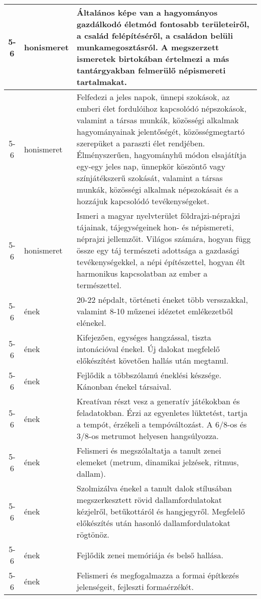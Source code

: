 \begin{small}
\begin{longtable}{c | p{2cm} |  p{11cm} }
              5-6 & honismeret & Általános képe van a hagyományos gazdálkodó életmód fontosabb területeiről, a család felépítéséről, a családon belüli munkamegosztásról. A megszerzett ismeretek birtokában értelmezi a más tantárgyakban felmerülő népismereti tartalmakat. \\ \hline
              5-6 & honismeret & Felfedezi a jeles napok, ünnepi szokások, az emberi élet fordulóihoz kapcsolódó népszokások, valamint a társas munkák, közösségi alkalmak hagyományainak jelentőségét, közösségmegtartó szerepüket a paraszti élet rendjében. Élményszerűen, hagyományhű módon elsajátítja egy-egy jeles nap, ünnepkör köszöntő vagy színjátékszerű szokását, valamint a társas munkák, közösségi alkalmak népszokásait és a hozzájuk kapcsolódó tevékenységeket. \\ \hline
              5-6 & honismeret & Ismeri a magyar nyelvterület földrajzi-néprajzi tájainak, tájegységeinek hon- és népismereti, néprajzi jellemzőit. Világos számára, hogyan függ össze egy táj természeti adottsága a gazdasági tevékenységekkel, a népi építészettel, hogyan élt harmonikus kapcsolatban az ember a természettel. \\ \hline
              5-6 & ének & 20-22 népdalt, történeti éneket több versszakkal, valamint 8-10 műzenei idézetet emlékezetből elénekel. \\ \hline
              5-6 & ének & Kifejezően, egységes hangzással, tiszta intonációval énekel. Új dalokat megfelelő előkészítést követően hallás után megtanul. \\ \hline
              5-6 & ének & Fejlődik a többszólamú éneklési készsége. Kánonban énekel társaival. \\ \hline
              5-6 & ének & Kreatívan részt vesz a generatív játékokban és feladatokban. Érzi az egyenletes lüktetést, tartja a tempót, érzékeli a tempóváltozást. A 6/8-os és 3/8-os metrumot helyesen hangsúlyozza. \\ \hline
              5-6 & ének & Felismeri és megszólaltatja a tanult zenei elemeket (metrum, dinamikai jelzések, ritmus, dallam). \\ \hline
              5-6 & ének & Szolmizálva énekel a tanult dalok stílusában megszerkesztett rövid dallamfordulatokat kézjelről, betűkottáról és hangjegyről. Megfelelő előkészítés után hasonló dallamfordulatokat rögtönöz. \\ \hline
              5-6 & ének & Fejlődik zenei memóriája és belső hallása. \\ \hline
              5-6 & ének & Felismeri és megfogalmazza a formai építkezés jelenségeit, fejleszti formaérzékét. \\ \hline

\end{longtable}
\end{small}
